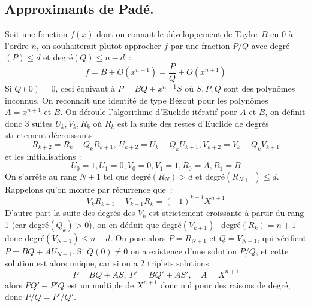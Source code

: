 \documentclass[a4paper,11pt]{book}
\begin{document}
\begin{giacjshere}
\section{Approximants de Padé.}
Soit une fonction $f(x)$ dont on connait le développement
de Taylor $B$ en 0 à l'ordre $n$, on souhaiterait plutot
approcher $f$ par une fraction $P/Q$ avec degré$(P) \leq d$
et degré$(Q) \leq n-d$~:
$$ f=B+O(x^{n+1})=\frac P Q +O(x^{n+1}) $$
Si $Q(0)=0$, ceci équivaut à $P=BQ+x^{n+1} S$ où $S, P,Q$ sont
des polynômes inconnus. On reconnait une identité de type
Bézout pour les polynômes $A=x^{n+1}$ et $B$.
On déroule l'algorithme d'Euclide itératif pour $A$ et $B$, on définit
donc 3 suites $U_k, V_k, R_k$ où $R_k$ est la suite des restes d'Euclide
de degrés strictement décroissants
$$ R_{k+2}=R_k - Q_k R_{k+1},\ U_{k+2}=U_k - Q_k U_{k+1}, V_{k+2}=V_k - Q_k V_{k+1} $$
et les initialisations~:
$$ U_0=1, U_1=0, V_0=0, V_1=1, R_0=A, R_1=B$$
On s'arrête au rang $N+1$ tel que degré$(R_N)>d$ et degré$(R_{N+1}) \leq d$.
Rappelons qu'on montre par récurrence que~:
$$ V_k R_{k+1} - V_{k+1} R_k = (-1)^{k+1} X^{n+1} $$
D'autre part la suite des degrés des $V_k$ est strictement croissante
à partir du rang 1 (car degré$(Q_k)>0$), on en déduit que
degré$(V_{k+1})$+degré$(R_k)=n+1$ donc degré$(V_{N+1}) \leq n-d$.
On pose alors $P=R_{N+1}$ et $Q=V_{N+1}$, qui vérifient
$P=BQ+AU_{N+1}$.
Si $Q(0) \neq 0$ on a existence d'une solution $P/Q$, 
et cette solution est alors
unique, car si on a 2 triplets solutions
$$ P=BQ+AS, \ P'=BQ'+AS', \quad A=X^{n+1}$$
alors $PQ'-P'Q$ est un multiple de $X^{n+1}$ donc nul pour des raisons
de degré, donc $P/Q=P'/Q'$.


\end{giacjshere}
\end{document}
